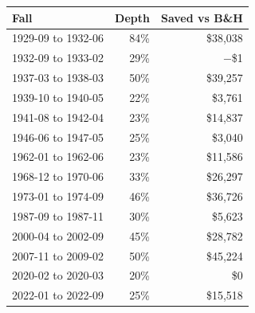 \begin{tabular}{lrr}
\toprule
Fall & Depth & Saved vs B\&H \\
\midrule
1929-09 to 1932-06 & 84\% & \$38,038 \\
1932-09 to 1933-02 & 29\% & $-$\$1 \\
1937-03 to 1938-03 & 50\% & \$39,257 \\
1939-10 to 1940-05 & 22\% & \$3,761 \\
1941-08 to 1942-04 & 23\% & \$14,837 \\
1946-06 to 1947-05 & 25\% & \$3,040 \\
1962-01 to 1962-06 & 23\% & \$11,586 \\
1968-12 to 1970-06 & 33\% & \$26,297 \\
1973-01 to 1974-09 & 46\% & \$36,726 \\
1987-09 to 1987-11 & 30\% & \$5,623 \\
2000-04 to 2002-09 & 45\% & \$28,782 \\
2007-11 to 2009-02 & 50\% & \$45,224 \\
2020-02 to 2020-03 & 20\% & \$0 \\
2022-01 to 2022-09 & 25\% & \$15,518 \\
\bottomrule
\end{tabular}
